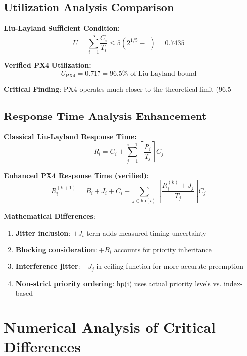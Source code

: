 \documentclass[12pt,a4paper]{article}
\begin{document}
\subsection{Utilization Analysis Comparison}

\textbf{Liu-Layland Sufficient Condition:}
\begin{equation}
U = \sum_{i=1}^{5} \frac{C_i}{T_i} \leq 5(2^{1/5} - 1) = 0.7435
\end{equation}

\textbf{Verified PX4 Utilization:}
\begin{equation}
U_{\text{PX4}} = 0.717 = 96.5\% \text{ of Liu-Layland bound}
\end{equation}

\textbf{Critical Finding}: PX4 operates much closer to the theoretical limit (96.5%

\subsection{Response Time Analysis Enhancement}

\textbf{Classical Liu-Layland Response Time:}
\begin{equation}
R_i = C_i + \sum_{j=1}^{i-1} \left\lceil \frac{R_i}{T_j} \right\rceil C_j
\end{equation}

\textbf{Enhanced PX4 Response Time (verified):}
\begin{equation}
R_i^{(k+1)} = B_i + J_i + C_i + \sum_{j \in \text{hp}(i)} \left\lceil \frac{R_i^{(k)} + J_j}{T_j} \right\rceil C_j
\end{equation}

\textbf{Mathematical Differences}:
\begin{enumerate}
\item \textbf{Jitter inclusion}: $+J_i$ term adds measured timing uncertainty
\item \textbf{Blocking consideration}: $+B_i$ accounts for priority inheritance
\item \textbf{Interference jitter}: $+J_j$ in ceiling function for more accurate preemption
\item \textbf{Non-strict priority ordering}: hp(i) uses actual priority levels vs. index-based
\end{enumerate}

\section{Numerical Analysis of Critical Differences}
\end{document}
